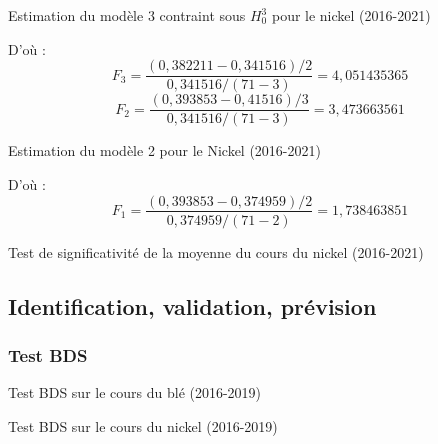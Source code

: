 \documentclass[12pt,a4paper]{article}
\begin{document}
\begin{table}[H]
    \centering
    \caption{Estimation du modèle 3 contraint sous $H_{0}^{3}$ pour le nickel (2016-2021)}
    \label{tab:mod3cont_nickel21}
    \sffamily
    \resizebox{0.8\textwidth}{!}{}
\end{table}
D'où : 
\begin{equation*}
    F_{3} = \frac{(0,382211 -  0,341516)/2}{0,341516/(71-3)} = 4,051435365
\end{equation*}
\begin{equation*}
    F_{2} = \frac{(0,393853 -  0,41516)/3}{0,341516/(71-3)} = 3,473663561
\end{equation*}
\begin{table}[H]
    \centering
    \caption{Estimation du modèle 2 pour le Nickel (2016-2021)}
    \label{tab:mod2_nickel21}
    \sffamily
    \resizebox{0.8\textwidth}{!}{}
\end{table}
D'où : 
\begin{equation*}
    F_{1} = \frac{(0,393853 -  0,374959)/2}{0,374959 /(71-2)} = 1,738463851
\end{equation*}
\begin{table}[H]
    \centering
    \caption{Test de significativité de la moyenne du cours du nickel (2016-2021)}
    \label{tab:testmoy_nickel21}
    \sffamily
    \resizebox{0.6\textwidth}{!}{}
\end{table}


\subsection{Identification, validation, prévision}
\subsubsection{Test BDS}\label{appendix:bds}
\begin{table}[H]
    \centering
    \caption{Test BDS sur le cours du blé (2016-2019)}
    \sffamily
    \resizebox{0.9\textwidth}{!}{}
\end{table}

\begin{table}[H]
    \centering
    \caption{Test BDS sur le cours du nickel (2016-2019)}
    \sffamily
    \resizebox{0.9\textwidth}{!}{}
\end{table}
\end{document}
